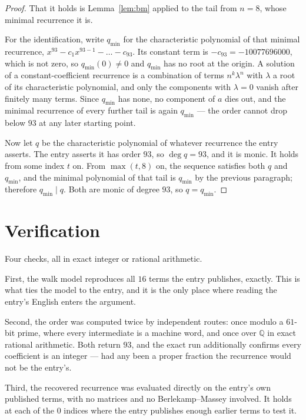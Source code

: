 \documentclass[11pt,a4paper]{article}
\theoremstyle{plain}
\theoremstyle{definition}
\begin{document}
\begin{proof}
That it holds is Lemma~\ref{lem:bm} applied to the tail from $n=8$, whose minimal
recurrence it is.

For the identification, write $q_{\min}$ for the characteristic polynomial of that minimal
recurrence, $x^{93}-c_1x^{93-1}-\dots-c_{93}$. Its constant term is
$-c_{93}=-10077696000$, which is not zero, so $q_{\min}(0)\neq0$ and $q_{\min}$ has no
root at the origin. A solution of a constant-coefficient recurrence is a combination of terms
$n^{k}\lambda^{n}$ with $\lambda$ a root of its characteristic polynomial, and only the
components with $\lambda=0$ vanish after finitely many terms. Since $q_{\min}$ has none, no
component of $a$ dies out, and the minimal recurrence of every further tail is again
$q_{\min}$ --- the order cannot drop below $93$ at any later starting point.

Now let $q$ be the characteristic polynomial of whatever recurrence the entry asserts. The
entry asserts it has order $93$, so $\deg q=93$, and it is monic. It holds from some
index $t$ on. From $\max(t,8)$ on, the sequence satisfies both $q$ and $q_{\min}$, and
the minimal polynomial of that tail is $q_{\min}$ by the previous paragraph; therefore
$q_{\min}\mid q$. Both are monic of degree $93$, so $q=q_{\min}$.
\end{proof}

\section{Verification}

Four checks, all in exact integer or rational arithmetic.

First, the walk model reproduces all $16$ terms the entry publishes, exactly. This is
what ties the model to the entry, and it is the only place where reading the entry's English
enters the argument.

Second, the order was computed twice by independent routes: once modulo a $61$-bit prime, where
every intermediate is a machine word, and once over $\mathbb{Q}$ in exact rational arithmetic.
Both return $93$, and the exact run additionally confirms every coefficient is an integer
--- had any been a proper fraction the recurrence would not be the entry's.

Third, the recovered recurrence was evaluated directly on the entry's own published terms, with
no matrices and no Berlekamp--Massey involved. It holds at each of the $0$ indices where
the entry publishes enough earlier terms to test it.
\end{document}
